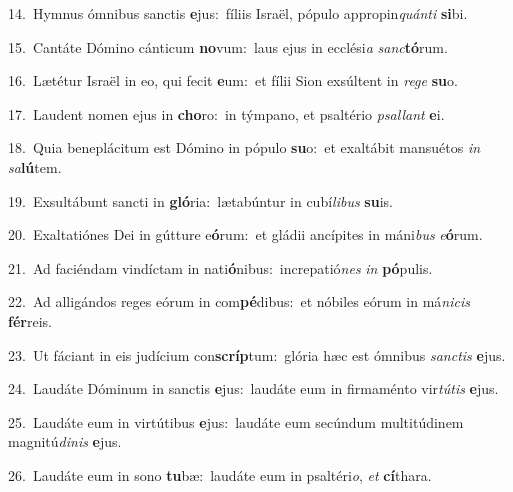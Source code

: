 {\numbfont\textcolor{\numbcolor}{14.}}~Hymnus ómnibus sanctis \textbf{e}\-jus:~\star fíliis Israël, pópulo appropin\-\textit{quán}\-\textit{ti} \textbf{si}\-bi.\par
{\numbfont\textcolor{\numbcolor}{15.}}~Cantáte Dómino cánticum \textbf{no}\-vum:~\star laus ejus in ecclési\textit{a} \textit{sanc}\-\textbf{tó}rum.\par
{\numbfont\textcolor{\numbcolor}{16.}}~Lætétur Israël in eo, qui fecit \textbf{e}\-um:~\star et fílii Sion exsúltent in \textit{re}\-\textit{ge} \textbf{su}\-o.\par
{\numbfont\textcolor{\numbcolor}{17.}}~Laudent nomen ejus in \textbf{cho}\-ro:~\star in týmpano, et psaltério \textit{psal}\-\textit{lant} \textbf{e}\-i.\par
{\numbfont\textcolor{\numbcolor}{18.}}~Quia beneplácitum est Dómino in pópulo \textbf{su}\-o:~\star et exaltábit mansuétos \textit{in} \textit{sa}\-\textbf{lú}tem.\par
{\numbfont\textcolor{\numbcolor}{19.}}~Exsultábunt sancti in \textbf{gló}\-ria:~\star lætabúntur in cubí\-\textit{li}\-\textit{bus} \textbf{su}\-is.\par
{\numbfont\textcolor{\numbcolor}{20.}}~Exaltatiónes Dei in gútture e\-\textbf{ó}\-rum:~\star et gládii ancípites in máni\textit{bus} \textit{e}\-\textbf{ó}rum.\par
{\numbfont\textcolor{\numbcolor}{21.}}~Ad faciéndam vindíctam in nati\-\textbf{ó}\-nibus:~\star increpatió\textit{nes} \textit{in} \textbf{pó}\-pulis.\par
{\numbfont\textcolor{\numbcolor}{22.}}~Ad alligándos reges eórum in com\-\textbf{pé}\-dibus:~\star et nóbiles eórum in má\-\textit{ni}\-\textit{cis} \textbf{fér}\-reis.\par
{\numbfont\textcolor{\numbcolor}{23.}}~Ut fáciant in eis judícium con\-\textbf{scríp}\-tum:~\star glória hæc est ómnibus \textit{sanc}\-\textit{tis} \textbf{e}\-jus.\par
{\numbfont\textcolor{\numbcolor}{24.}}~Laudáte Dóminum in sanctis \textbf{e}\-jus:~\star laudáte eum in firmaménto vir\-\textit{tú}\-\textit{tis} \textbf{e}\-jus.\par
{\numbfont\textcolor{\numbcolor}{25.}}~Laudáte eum in virtútibus \textbf{e}\-jus:~\star laudáte eum secúndum multitúdinem magnitú\-\textit{di}\-\textit{nis} \textbf{e}\-jus.\par
{\numbfont\textcolor{\numbcolor}{26.}}~Laudáte eum in sono \textbf{tu}\-bæ:~\star laudáte eum in psaltéri\-\textit{o}\-, \textit{et} \textbf{cí}\-thara.\par
